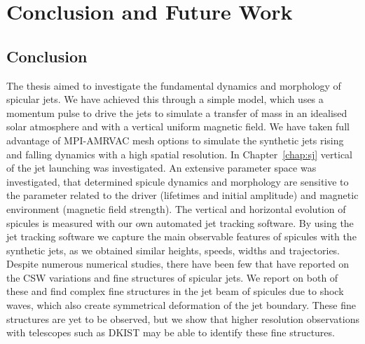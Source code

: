 \chapter{Conclusion and Future Work}
\label{chap:con_and_fut_work}
\section{Conclusion}
\label{sec:con}
The thesis aimed to investigate the fundamental dynamics and morphology of spicular jets. We have achieved this through a simple model, which uses a momentum pulse to drive the jets to simulate a transfer of mass in an idealised solar atmosphere and with a vertical uniform magnetic field. We have taken full advantage of MPI-AMRVAC mesh options to simulate the synthetic jets rising and falling dynamics with a high spatial resolution. In Chapter~\ref{chap:sj} vertical of the jet launching was investigated. An extensive parameter space was investigated, that determined spicule dynamics and morphology are sensitive to the parameter related to the driver (lifetimes and initial amplitude) and magnetic environment (magnetic field strength). The vertical and horizontal evolution of spicules is measured with our own automated jet tracking software. By using the jet tracking software we capture the main observable features of spicules with the synthetic jets, as we obtained similar heights, speeds, widths and trajectories. Despite numerous numerical studies, there have been few that have reported on the CSW variations and fine structures of spicular jets. We report on both of these and find complex fine structures in the jet beam of spicules due to shock waves, which also create symmetrical deformation of the jet boundary. These fine structures are yet to be observed, but we show that higher resolution observations with telescopes such as DKIST may be able to identify these fine structures.  \np
%
